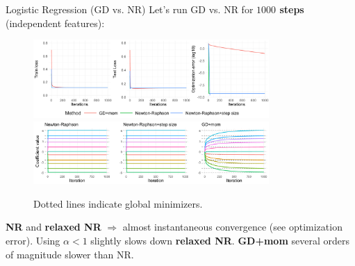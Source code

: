\documentclass[11pt,compress,t,notes=noshow, xcolor=table]{beamer}
\begin{document}
\begin{vbframe}{Logistic Regression (GD vs. NR)}
\vspace{-0.4cm}
Let's run GD vs. NR for \textbf{$1000$ steps} (independent features):
\begin{figure}
            \includegraphics[width=0.8\textwidth]{slides/05-multivariate-second-order/figure_man/simu-newton/NR_GD_log_indep_1000iters.pdf} \\
             \includegraphics[width=0.8\textwidth]{slides/05-multivariate-second-order/figure_man/simu-newton/NR_GD_log_coef_1000indep.pdf}\\
            \begin{footnotesize}
            Dotted lines indicate global minimizers.
            \end{footnotesize}
\end{figure}
\vspace{-0.3cm}
\textbf{NR} and \textbf{relaxed NR} $\Rightarrow$ almost instantaneous convergence (see optimization error). Using $\alpha<1$ slightly slows down \textbf{relaxed NR}. \textbf{GD+mom} several orders of magnitude slower than NR. 
\end{vbframe}
\end{document}
